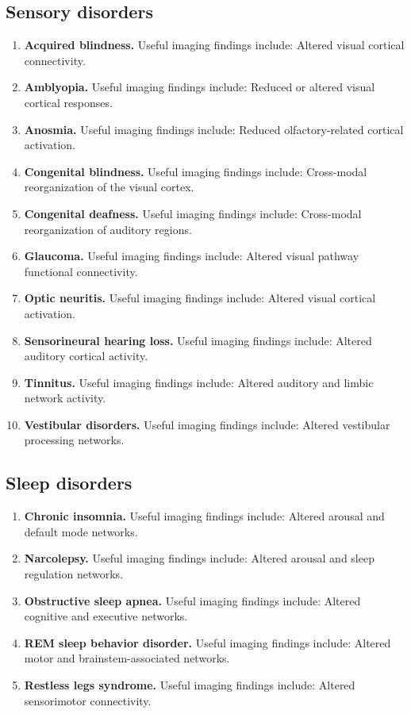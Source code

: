 \subsection{Sensory disorders}
\begin{enumerate}[leftmargin=*,itemsep=0.45em,topsep=0.4em]
\item \textbf{Acquired blindness.} Useful imaging findings include: Altered visual cortical connectivity.
\item \textbf{Amblyopia.} Useful imaging findings include: Reduced or altered visual cortical responses.
\item \textbf{Anosmia.} Useful imaging findings include: Reduced olfactory-related cortical activation.
\item \textbf{Congenital blindness.} Useful imaging findings include: Cross-modal reorganization of the visual cortex.
\item \textbf{Congenital deafness.} Useful imaging findings include: Cross-modal reorganization of auditory regions.
\item \textbf{Glaucoma.} Useful imaging findings include: Altered visual pathway functional connectivity.
\item \textbf{Optic neuritis.} Useful imaging findings include: Altered visual cortical activation.
\item \textbf{Sensorineural hearing loss.} Useful imaging findings include: Altered auditory cortical activity.
\item \textbf{Tinnitus.} Useful imaging findings include: Altered auditory and limbic network activity.
\item \textbf{Vestibular disorders.} Useful imaging findings include: Altered vestibular processing networks.
\end{enumerate}

\subsection{Sleep disorders}
\begin{enumerate}[leftmargin=*,itemsep=0.45em,topsep=0.4em]
\item \textbf{Chronic insomnia.} Useful imaging findings include: Altered arousal and default mode networks.
\item \textbf{Narcolepsy.} Useful imaging findings include: Altered arousal and sleep regulation networks.
\item \textbf{Obstructive sleep apnea.} Useful imaging findings include: Altered cognitive and executive networks.
\item \textbf{REM sleep behavior disorder.} Useful imaging findings include: Altered motor and brainstem-associated networks.
\item \textbf{Restless legs syndrome.} Useful imaging findings include: Altered sensorimotor connectivity.
\end{enumerate}

